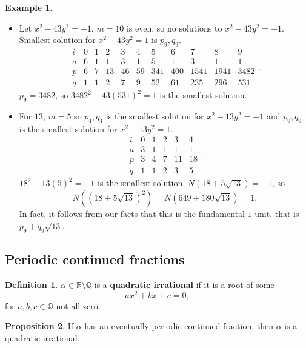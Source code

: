 \documentclass{article}
\newcommand{\Q}{\mathbb{Q}}
\newcommand{\R}{\mathbb{R}}
\newcommand{\rb}[1]{\left( #1 \right)}
\theoremstyle{definition}\newtheorem{definition}{Definition}
\theoremstyle{definition}\newtheorem{remark}[definition]{Remark}
\theoremstyle{definition}\newtheorem*{example}{Example}
\theoremstyle{definition}\newtheorem*{note}{Note}
\newtheorem{proposition}[definition]{Proposition}
\begin{document}
\begin{example}
\hfill
\begin{itemize}
\item Let $ x^2 - 43y^2 = \pm 1 $. $ m = 10 $ is even, so no solutions to $ x^2 - 43y^2 = -1 $. Smallest solution for $ x^2 - 43y^2 = 1 $ is $ p_9, q_9 $.
$$
\begin{array}{c|cccccccccc}
i & 0 & 1 & 2 & 3 & 4 & 5 & 6 & 7 & 8 & 9 \\
\hline
a & 6 & 1 & 1 & 3 & 1 & 5 & 1 & 3 & 1 & 1 \\
p & 6 & 7 & 13 & 46 & 59 & 341 & 400 & 1541 & 1941 & 3482 \\
q & 1 & 1 & 2 & 7 & 9 & 52 & 61 & 235 & 296 & 531
\end{array}.
$$
$ p_9 = 3482 $, so $ 3482^2 - 43\rb{531}^2 = 1 $ is the smallest solution.
\item For $ 13 $, $ m = 5 $ so $ p_4, q_4 $ is the smallest solution for $ x^2 - 13y^2 = -1 $ and $ p_9, q_9 $ is the smallest solution for $ x^2 - 13y^2 = 1 $.
$$
\begin{array}{c|ccccc}
i & 0 & 1 & 2 & 3 & 4 \\
\hline
a & 3 & 1 & 1 & 1 & 1 \\
p & 3 & 4 & 7 & 11 & 18 \\
q & 1 & 1 & 2 & 3 & 5
\end{array}.
$$
$ 18^2 - 13\rb{5}^2 = -1 $ is the smallest solution. $ N\rb{18 + 5\sqrt{13}} = -1 $, so
$$ N\rb{\rb{18 + 5\sqrt{13}}^2} = N\rb{649 + 180\sqrt{13}} = 1. $$
In fact, it follows from our facts that this is the fundamental $ 1 $-unit, that is $ p_9 + q_9\sqrt{13} $.
\end{itemize}
\end{example}


\subsection{Periodic continued fractions}

\begin{definition}
$ \alpha \in \R \setminus \Q $ is a \textbf{quadratic irrational} if it is a root of some
$$ ax^2 + bx + c = 0, $$
for $ a, b, c \in \Q $ not all zero.
\end{definition}

\begin{proposition}
If $ \alpha $ has an eventually periodic continued fraction, then $ \alpha $ is a quadratic irrational.
\end{proposition}
\end{document}
